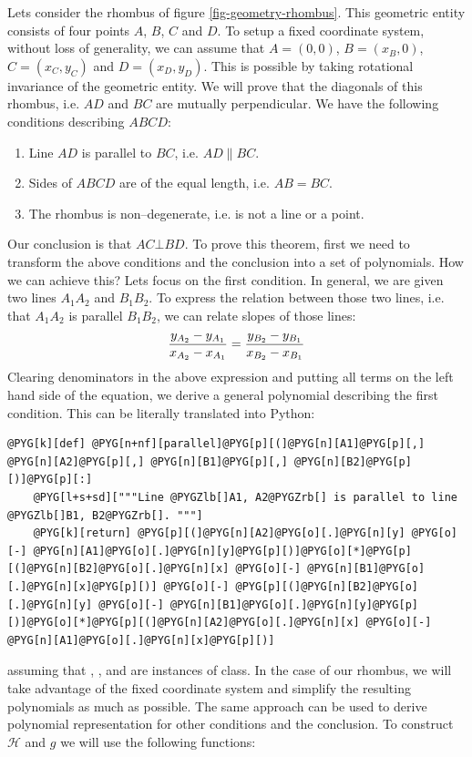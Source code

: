 Lets consider the rhombus of figure \ref{fig-geometry-rhombus}. This geometric entity consists of four
points $A$, $B$, $C$ and $D$. To setup a fixed coordinate system, without loss of generality, we can
assume that $A = (0, 0)$, $B = (x_B, 0)$, $C = (x_C, y_C)$ and $D = (x_D, y_D)$. This is possible by
taking rotational invariance of the geometric entity. We will prove that the diagonals of this rhombus,
i.e. $AD$ and $BC$ are mutually perpendicular. We have the following conditions describing $ABCD$:
\begin{enumerate}
\item {}
Line $AD$ is parallel to $BC$, i.e. $AD \parallel BC$.

\item {}
Sides of $ABCD$ are of the equal length, i.e. $AB = BC$.

\item {}
The rhombus is non--degenerate, i.e. is not a line or a point.

\end{enumerate}

Our conclusion is that $AC \bot BD$. To prove this theorem, first we need to transform the above conditions
and the conclusion into a set of polynomials. How we can achieve this? Lets focus on the first condition. In
general, we are given two lines $A_1A_2$ and $B_1B_2$. To express the relation between those two lines, i.e.
that $A_1A_2$ is parallel $B_1B_2$, we can relate slopes of those lines:
\begin{gather}
\begin{split}\frac{y_{A_2} - y_{A_1}}{x_{A_2} - x_{A_1}} = \frac{y_{B_2} - y_{B_1}}{x_{B_2} - x_{B_1}}\end{split}\notag
\end{gather}
Clearing denominators in the above expression and putting all terms on the left hand side of the equation, we
derive a general polynomial describing the first condition. This can be literally translated into Python:

\begin{Verbatim}[commandchars=@\[\]]
@PYG[k][def] @PYG[n+nf][parallel]@PYG[p][(]@PYG[n][A1]@PYG[p][,] @PYG[n][A2]@PYG[p][,] @PYG[n][B1]@PYG[p][,] @PYG[n][B2]@PYG[p][)]@PYG[p][:]
    @PYG[l+s+sd]["""Line @PYGZlb[]A1, A2@PYGZrb[] is parallel to line @PYGZlb[]B1, B2@PYGZrb[]. """]
    @PYG[k][return] @PYG[p][(]@PYG[n][A2]@PYG[o][.]@PYG[n][y] @PYG[o][-] @PYG[n][A1]@PYG[o][.]@PYG[n][y]@PYG[p][)]@PYG[o][*]@PYG[p][(]@PYG[n][B2]@PYG[o][.]@PYG[n][x] @PYG[o][-] @PYG[n][B1]@PYG[o][.]@PYG[n][x]@PYG[p][)] @PYG[o][-] @PYG[p][(]@PYG[n][B2]@PYG[o][.]@PYG[n][y] @PYG[o][-] @PYG[n][B1]@PYG[o][.]@PYG[n][y]@PYG[p][)]@PYG[o][*]@PYG[p][(]@PYG[n][A2]@PYG[o][.]@PYG[n][x] @PYG[o][-] @PYG[n][A1]@PYG[o][.]@PYG[n][x]@PYG[p][)]
\end{Verbatim}
\noindent
assuming that , ,  and  are instances of  class. In the case of our
rhombus, we will take advantage of the fixed coordinate system and simplify the resulting polynomials as
much as possible. The same approach can be used to derive polynomial representation for other conditions
and the conclusion. To construct $\mathcal{H}$ and $g$ we will use the following functions:

